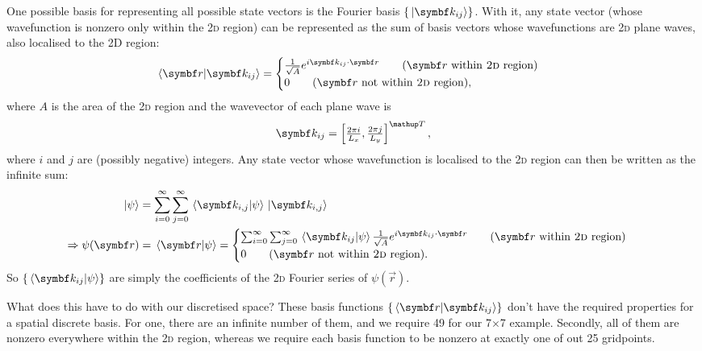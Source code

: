 One possible basis for representing all possible state vectors is the Fourier basis $\{\ket{\vec k_{ij}}\}$. With it, any state vector (whose wavefunction is nonzero only within the \textsc{2d} region) can be represented as the sum of basis vectors whose wavefunctions are \textsc{2d} plane waves, also localised to the 2D region:
\begin{align}\label{eq:spatial_plane_wave_basis}
\braket{\vec r}{\vec k_{ij}} = \begin{cases}
\frac 1 {\sqrt A} e^{i\vec k_{ij}\cdot\vec r}\qquad (\vec r\ \textrm{within \textsc{2d} region})\\
0\qquad(\vec r\ \textrm{not within \textsc{2d} region}),
\end{cases}
\end{align}
where $A$ is the area of the \textsc{2d} region and the wavevector of each plane wave is
\begin{align}
\vec k_{ij} = \left[ \tfrac {2\pi i}{L_x}, \tfrac {2\pi j}{L_y}\right]^\up{T},
\end{align}
where $i$ and $j$ are (possibly negative) integers. Any state vector whose wavefunction is localised to the \textsc{2d} region can then be written as the infinite sum:
\begin{align}
\ket\psi &= \sum_{i=0}^\infty\sum_{j=0}^\infty \braket{\vec k_{i,j}}\psi \ket{\vec k_{i,j}}\\
\Rightarrow \psi(\vec r) &= \braket{\vec r}{\psi} = \begin{cases}
\sum_{i=0}^\infty\sum_{j=0}^\infty \braket{\vec k_{ij}}\psi \frac 1 {\sqrt A} e^{i\vec k_{ij}\cdot\vec r}
\qquad (\vec r\ \textrm{within \textsc{2d} region})\\
0\qquad(\vec r\ \textrm{not within \textsc{2d} region}).
\end{cases}
\end{align}
So $\{\braket{\vec k_{ij}}\psi\}$ are simply the coefficients of the \textsc{2d} Fourier series of $\psi(\vec r)$.

What does this have to do with our discretised space? These basis functions $\{\braket{\vec r}{\vec k_{ij}}\}$ don't have the required properties for a spatial discrete basis. For one, there are an infinite number of them, and we require 49 for our 7$\times$7 example. Secondly, all of them are nonzero everywhere within the \textsc{2d} region, whereas we require each basis function to be nonzero at exactly one of out 25 gridpoints.

